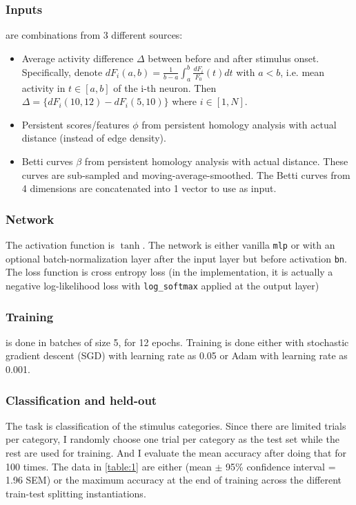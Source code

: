 \subsubsection*{Inputs}

are combinations from 3 different sources:

\begin{itemize}
    \item Average activity difference $\Delta$ between before and after stimulus onset. Specifically, denote $dF_i(a,b) = \frac{1}{b-a}\int_a^b \frac{dF_i}{F_0}(t) dt$ with $a<b$, i.e. mean activity in $t \in [a,b]$ of the i-th neuron. Then $\Delta = \{dF_i(10,12) - dF_i(5,10)\}$ where $i \in [1,N]$.
    \item Persistent scores/features $\phi$ from persistent homology analysis with actual distance (instead of edge density).
    \item Betti curves $\beta$ from persistent homology analysis with actual distance. These curves are sub-sampled and moving-average-smoothed. The Betti curves from 4 dimensions are concatenated into 1 vector to use as input.
\end{itemize}

\subsubsection*{Network}

The activation function is $\tanh$. The network is either vanilla \texttt{mlp} or with an optional batch-normalization layer after the input layer but before activation \texttt{bn}. The loss function is cross entropy loss (in the implementation, it is actually a negative log-likelihood loss with \texttt{log\_softmax} applied at the output layer)

\subsubsection*{Training}

is done in batches of size 5, for 12 epochs. Training is done either with stochastic gradient descent (SGD) with learning rate as 0.05 or Adam with learning rate as 0.001.

\subsubsection*{Classification and held-out}

The task is classification of the stimulus categories. Since there are limited trials per category, I randomly choose one trial per category as the test set while the rest are used for training. And I evaluate the mean accuracy after doing that for 100 times. The data in \autoref{table:1} are either (mean $\pm$ 95\% confidence interval = 1.96 SEM) or the maximum accuracy at the end of training across the different train-test splitting instantiations.

